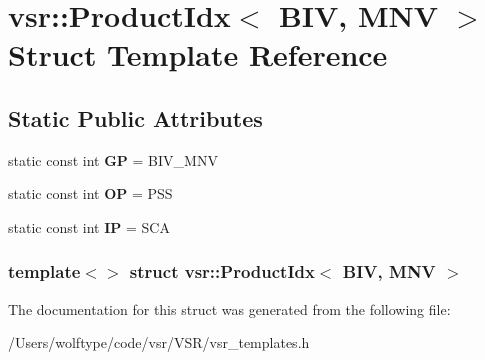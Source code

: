 \hypertarget{structvsr_1_1_product_idx_3_01_b_i_v_00_01_m_n_v_01_4}{\section{vsr\-:\-:Product\-Idx$<$ B\-I\-V, M\-N\-V $>$ Struct Template Reference}
\label{structvsr_1_1_product_idx_3_01_b_i_v_00_01_m_n_v_01_4}
}
\subsection*{Static Public Attributes}
\begin{DoxyCompactItemize}
\item 
\hypertarget{structvsr_1_1_product_idx_3_01_b_i_v_00_01_m_n_v_01_4_a5e5dd5dedd214551a38de81b3e0e50f1}{static const int {\bfseries G\-P} = B\-I\-V\-\_\-\-M\-N\-V}\label{structvsr_1_1_product_idx_3_01_b_i_v_00_01_m_n_v_01_4_a5e5dd5dedd214551a38de81b3e0e50f1}

\item 
\hypertarget{structvsr_1_1_product_idx_3_01_b_i_v_00_01_m_n_v_01_4_a541c8968b12f1a99121034f1b0347777}{static const int {\bfseries O\-P} = P\-S\-S}\label{structvsr_1_1_product_idx_3_01_b_i_v_00_01_m_n_v_01_4_a541c8968b12f1a99121034f1b0347777}

\item 
\hypertarget{structvsr_1_1_product_idx_3_01_b_i_v_00_01_m_n_v_01_4_aca1e7327e97c7dfe6b8acfda70950fd8}{static const int {\bfseries I\-P} = S\-C\-A}\label{structvsr_1_1_product_idx_3_01_b_i_v_00_01_m_n_v_01_4_aca1e7327e97c7dfe6b8acfda70950fd8}

\end{DoxyCompactItemize}
\subsubsection*{template$<$$>$ struct vsr\-::\-Product\-Idx$<$ B\-I\-V, M\-N\-V $>$}



The documentation for this struct was generated from the following file\-:\begin{DoxyCompactItemize}
\item 
/\-Users/wolftype/code/vsr/\-V\-S\-R/vsr\-\_\-templates.\-h\end{DoxyCompactItemize}
